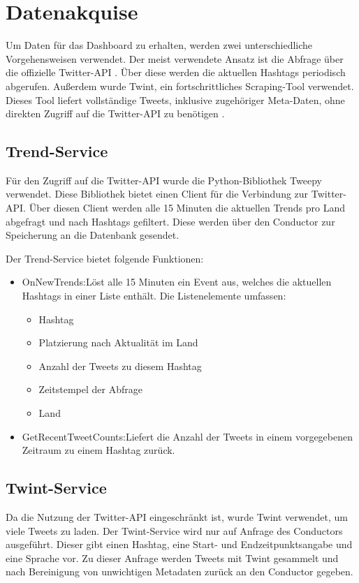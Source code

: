 \documentclass[conference]{IEEEtran}
\begin{document}


\section{Datenakquise}
Um Daten für das Dashboard zu erhalten, werden zwei unterschiedliche Vorgehensweisen verwendet.
Der meist verwendete Ansatz ist die Abfrage über die offizielle Twitter-API \cite{twitterapi}.
Über diese werden die aktuellen Hashtags periodisch abgerufen.
Außerdem wurde Twint, ein fortschrittliches Scraping-Tool verwendet.
Dieses Tool liefert vollständige Tweets, inklusive zugehöriger Meta-Daten,
ohne direkten Zugriff auf die Twitter-API zu benötigen \cite{twint}.

\newpage 

\subsection*{Trend-Service}
Für den Zugriff auf die Twitter-API wurde die Python-Bibliothek Tweepy \cite{tweepy} verwendet.
Diese Bibliothek bietet einen Client für die Verbindung zur Twitter-API.
Über diesen Client werden alle 15 Minuten die aktuellen Trends pro Land abgefragt und nach Hashtags gefiltert.
Diese werden über den Conductor zur Speicherung an die Datenbank gesendet.

Der Trend-Service bietet folgende Funktionen:
\begin{itemize}
    \item OnNewTrends:\newline Löst alle 15 Minuten ein Event aus, welches die aktuellen Hashtags in einer Liste enthält. Die Listenelemente umfassen:
          \begin{itemize}
              \item Hashtag
              \item Platzierung nach Aktualität im Land
              \item Anzahl der Tweets zu diesem Hashtag
              \item Zeitstempel der Abfrage
              \item Land
          \end{itemize}
    \item GetRecentTweetCounts:\newline Liefert die Anzahl der Tweets in einem vorgegebenen Zeitraum zu einem Hashtag zurück.

\end{itemize}

\subsection*{Twint-Service}
Da die Nutzung der Twitter-API eingeschränkt ist, wurde Twint verwendet, um viele Tweets zu laden.
Der Twint-Service wird nur auf Anfrage des Conductors ausgeführt.
Dieser gibt einen Hashtag, eine Start- und Endzeitpunktsangabe und eine Sprache vor.
Zu dieser Anfrage werden Tweets mit Twint gesammelt und nach Bereinigung von unwichtigen Metadaten zurück an den Conductor gegeben.
\end{document}
